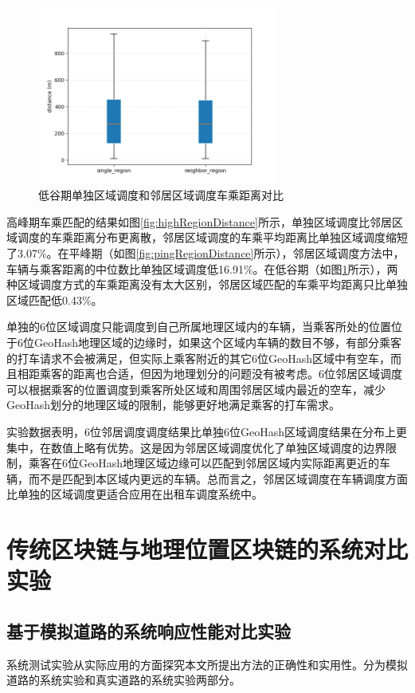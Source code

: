 \begin{figure}[h]
  \centering
  \includegraphics[height=0.3\textheight,width=0.7\textwidth]{figures/低谷车乘匹配}
  \caption{低谷期单独区域调度和邻居区域调度车乘距离对比}\label{fig:shaoRegionDistance}
\end{figure}

高峰期车乘匹配的结果如图\ref{fig:highRegionDistance}所示，单独区域调度比邻居区域调度的车乘距离分布更离散，邻居区域调度的车乘平均距离比单独区域调度缩短了3.07$\%$。在平峰期（如图\ref{fig:pingRegionDistance}所示），邻居区域调度方法中，车辆与乘客距离的中位数比单独区域调度低16.91$\%$。在低谷期（如图\ref{fig:shaoRegionDistance}所示），两种区域调度方式的车乘距离没有太大区别，邻居区域匹配的车乘平均距离只比单独区域匹配低0.43$\%$。

单独的6位区域调度只能调度到自己所属地理区域内的车辆，当乘客所处的位置位于6位GeoHash地理区域的边缘时，如果这个区域内车辆的数目不够，有部分乘客的打车请求不会被满足，但实际上乘客附近的其它6位GeoHash区域中有空车，而且相距乘客的距离也合适，但因为地理划分的问题没有被考虑。6位邻居区域调度可以根据乘客的位置调度到乘客所处区域和周围邻居区域内最近的空车，减少GeoHash划分的地理区域的限制，能够更好地满足乘客的打车需求。

实验数据表明，6位邻居调度调度结果比单独6位GeoHash区域调度结果在分布上更集中，在数值上略有优势。这是因为邻居区域调度优化了单独区域调度的边界限制，乘客在6位GeoHash地理区域边缘可以匹配到邻居区域内实际距离更近的车辆，而不是匹配到本区域内更远的车辆。总而言之，邻居区域调度在车辆调度方面比单独的区域调度更适合应用在出租车调度系统中。

\section{传统区块链与地理位置区块链的系统对比实验}
\subsection{基于模拟道路的系统响应性能对比实验}
系统测试实验从实际应用的方面探究本文所提出方法的正确性和实用性。分为模拟道路的系统实验和真实道路的系统实验两部分。

